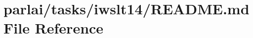 \hypertarget{parlai_2tasks_2iwslt14_2README_8md}{}\section{parlai/tasks/iwslt14/\+R\+E\+A\+D\+ME.md File Reference}
\label{parlai_2tasks_2iwslt14_2README_8md}
